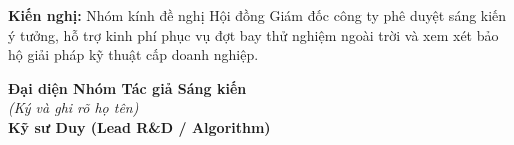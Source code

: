 \documentclass[12pt,a4paper]{article}
\begin{document}
\vspace{1.5em}
\noindent
\textbf{Kiến nghị:} Nhóm kính đề nghị Hội đồng Giám đốc công ty phê duyệt sáng kiến ý tưởng, hỗ trợ kinh phí phục vụ đợt bay thử nghiệm ngoài trời và xem xét bảo hộ giải pháp kỹ thuật cấp doanh nghiệp.

\vspace{2.5em}
\begin{flushright}
    \textbf{Đại diện Nhóm Tác giả Sáng kiến}\\[0.3em]
    \textit{(Ký và ghi rõ họ tên)}\\[3.5em]
    \textbf{Kỹ sư Duy (Lead R\&D / Algorithm)}
\end{flushright}
\end{document}
